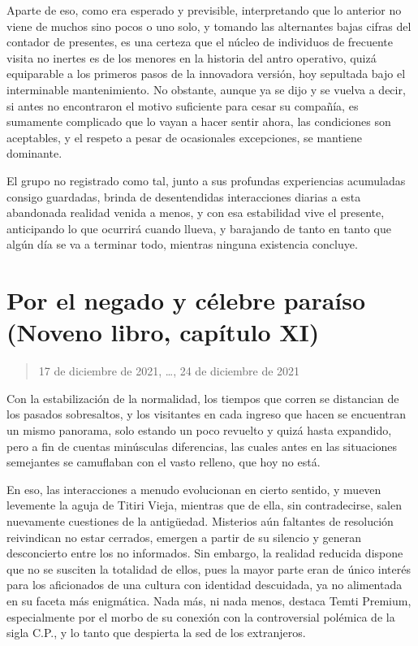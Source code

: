 \documentclass[
  spanish,
]{book}
\begin{document}
Aparte de eso, como era esperado y previsible, interpretando que lo anterior no viene de muchos sino pocos o uno solo, y tomando las alternantes bajas cifras del contador de presentes, es una certeza que el núcleo de individuos de frecuente visita no inertes es de los menores en la historia del antro operativo, quizá equiparable a los primeros pasos de la innovadora versión, hoy sepultada bajo el interminable mantenimiento. No obstante, aunque ya se dijo y se vuelva a decir, si antes no encontraron el motivo suficiente para cesar su compañía, es sumamente complicado que lo vayan a hacer sentir ahora, las condiciones son aceptables, y el respeto a pesar de ocasionales excepciones, se mantiene dominante.

El grupo no registrado como tal, junto a sus profundas experiencias acumuladas consigo guardadas, brinda de desentendidas interacciones diarias a esta abandonada realidad venida a menos, y con esa estabilidad vive el presente, anticipando lo que ocurrirá cuando llueva, y barajando de tanto en tanto que algún día se va a terminar todo, mientras ninguna existencia concluye.

\hypertarget{por-el-negado-y-cuxe9lebre-parauxedso-noveno-libro-capuxedtulo-xi}{%
\section{Por el negado y célebre paraíso (Noveno libro, capítulo XI)}\label{por-el-negado-y-cuxe9lebre-parauxedso-noveno-libro-capuxedtulo-xi}}

\begin{quote}
17 de diciembre de 2021, \ldots, 24 de diciembre de 2021
\end{quote}

Con la estabilización de la normalidad, los tiempos que corren se distancian de los pasados sobresaltos, y los visitantes en cada ingreso que hacen se encuentran un mismo panorama, solo estando un poco revuelto y quizá hasta expandido, pero a fin de cuentas minúsculas diferencias, las cuales antes en las situaciones semejantes se camuflaban con el vasto relleno, que hoy no está.

En eso, las interacciones a menudo evolucionan en cierto sentido, y mueven levemente la aguja de Titiri Vieja, mientras que de ella, sin contradecirse, salen nuevamente cuestiones de la antigüedad. Misterios aún faltantes de resolución reivindican no estar cerrados, emergen a partir de su silencio y generan desconcierto entre los no informados. Sin embargo, la realidad reducida dispone que no se susciten la totalidad de ellos, pues la mayor parte eran de único interés para los aficionados de una cultura con identidad descuidada, ya no alimentada en su faceta más enigmática. Nada más, ni nada menos, destaca Temti Premium, especialmente por el morbo de su conexión con la controversial polémica de la sigla C.P., y lo tanto que despierta la sed de los extranjeros.
\end{document}
